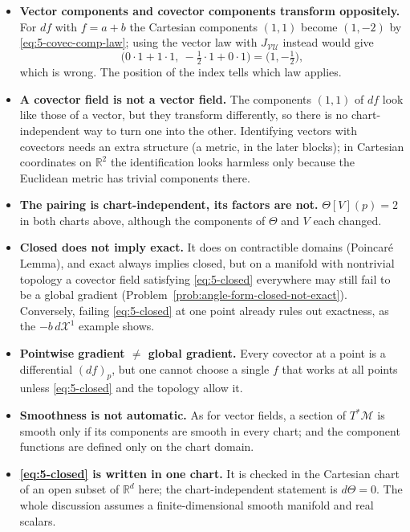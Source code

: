 \documentclass[11pt]{article}
\begin{document}
\begin{itemize}
  \item \textbf{Vector components and covector components transform oppositely.} For $df$ with $f=a+b$ the Cartesian components $(1,1)$ become $(1,-2)$ by \eqref{eq:5-covec-comp-law}; using the vector law with $J_{\mathcal{VU}}$ instead would give
  \[
  \big(0\cdot1+1\cdot1,\ -\tfrac12\cdot1+0\cdot1\big)=\big(1,-\tfrac12\big),
  \]
  which is wrong. The position of the index tells which law applies.
  \item \textbf{A covector field is not a vector field.} The components $(1,1)$ of $df$ look like those of a vector, but they transform differently, so there is no chart-independent way to turn one into the other. Identifying vectors with covectors needs an extra structure (a metric, in the later blocks); in Cartesian coordinates on $\mathbb R^2$ the identification looks harmless only because the Euclidean metric has trivial components there.
  \item \textbf{The pairing is chart-independent, its factors are not.} $\Theta[V](p)=2$ in both charts above, although the components of $\Theta$ and $V$ each changed.
  \item \textbf{Closed does not imply exact.} It does on contractible domains (Poincar\'e Lemma), and exact always implies closed, but on a manifold with nontrivial topology a covector field satisfying \eqref{eq:5-closed} everywhere may still fail to be a global gradient (Problem~\ref{prob:angle-form-closed-not-exact}). Conversely, failing \eqref{eq:5-closed} at one point already rules out exactness, as the $-b\,d\mathcal X^1$ example shows.
  \item \textbf{Pointwise gradient $\neq$ global gradient.} Every covector at a point is a differential $(df)_p$, but one cannot choose a single $f$ that works at all points unless \eqref{eq:5-closed} and the topology allow it.
  \item \textbf{Smoothness is not automatic.} As for vector fields, a section of $T^*\mathcal M$ is smooth only if its components are smooth in every chart; and the component functions are defined only on the chart domain.
  \item \textbf{\eqref{eq:5-closed} is written in one chart.} It is checked in the Cartesian chart of an open subset of $\mathbb R^d$ here; the chart-independent statement is $d\Theta=0$. The whole discussion assumes a finite-dimensional smooth manifold and real scalars.
\end{itemize}
\end{document}
